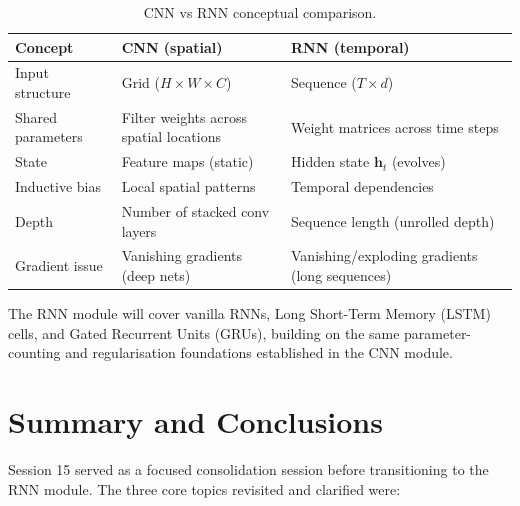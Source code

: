 \documentclass[12pt,a4paper]{article}
\begin{document}
\begin{table}[ht]
  \centering
  \caption{CNN vs RNN conceptual comparison.}
  \label{tab:cnn_vs_rnn}
  \begin{tabularx}{\linewidth}{@{}lXX@{}}
    \toprule
    Concept & CNN (spatial) & RNN (temporal) \\
    \midrule
    Input structure   & Grid ($H \times W \times C$)
                      & Sequence ($T \times d$) \\
    Shared parameters & Filter weights across spatial locations
                      & Weight matrices across time steps \\
    State             & Feature maps (static)
                      & Hidden state $\mathbf{h}_t$ (evolves) \\
    Inductive bias    & Local spatial patterns
                      & Temporal dependencies \\
    Depth             & Number of stacked conv layers
                      & Sequence length (unrolled depth) \\
    Gradient issue    & Vanishing gradients (deep nets)
                      & Vanishing/exploding gradients (long sequences) \\
    \bottomrule
  \end{tabularx}
\end{table}

\noindent
The RNN module will cover vanilla RNNs, Long Short-Term Memory (LSTM) cells,
and Gated Recurrent Units (GRUs), building on the same parameter-counting
and regularisation foundations established in the CNN module.

\section{Summary and Conclusions}
\label{sec:conclusion}

Session 15 served as a focused consolidation session before transitioning
to the RNN module. The three core topics revisited and clarified were:
\end{document}
